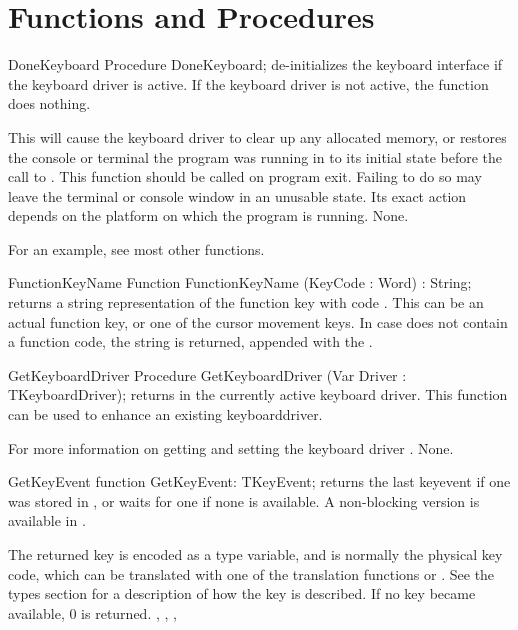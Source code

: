 \section{Functions and Procedures}

\begin{procedure}{DoneKeyboard}
\Declaration
Procedure DoneKeyboard;
\Description
{} de-initializes the keyboard interface if the keyboard
driver is active. If the keyboard driver is not active, the function does
nothing.

This will cause the keyboard driver to clear up any allocated memory, 
or restores the console or terminal the program was running in to its 
initial state before the call to . This function should 
be called on program exit. Failing to do so may leave the terminal or
console window in an unusable state. Its exact action depends on the 
platform on which the program is running.
\Errors
None.
\SeeAlso
{}
\end{procedure}

For an example, see most other functions.

\begin{function}{FunctionKeyName}
\Declaration
Function FunctionKeyName (KeyCode : Word) : String;
\Description
{} returns a string representation of the function key
with code . This can be an actual function key, or one of the
cursor movement keys.
\Errors
In case  does not contain a function code, the
 string is returned, appended with the
.
\SeeAlso
{}
\end{function}


\begin{procedure}{GetKeyboardDriver}
\Declaration
Procedure GetKeyboardDriver (Var Driver : TKeyboardDriver);
\Description
{} returns in  the currently active
keyboard driver. This function can be used to enhance an existing
keyboarddriver.

For more information on getting and setting the keyboard driver
.
\Errors
None.
\SeeAlso
{}
\end{procedure}

\begin{function}{GetKeyEvent}
\Declaration
function GetKeyEvent: TKeyEvent;
\Description
{} returns the last keyevent if one was stored in
, or waits for one if none is available.
A non-blocking version is available in .

The returned key is encoded as a  type variable, and
is normally the physical key code, which can be translated with one
of the translation functions  or
. See the types section for a 
description of how the key is described.
\Errors
If no key became available, 0 is returned.
\SeeAlso
{}, , ,
\end{function}

